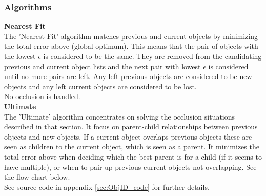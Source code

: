 \subsubsection{Algorithms}
\textbf{Nearest Fit} \\
The 'Nearest Fit' algorithm matches previous and current objects by minimizing the total error above (global optimum). This means that the pair of objects with the lowest $\epsilon$ is considered to be the same. They are removed from the candidating previous and current object lists and the next pair with lowest $\epsilon$ is considered until no more pairs are left. Any left previous objects are considered to be new objects and any left current objects are considered to be lost. \\
No occlusion is handled. \\
\newline
\textbf{Ultimate}\\
The 'Ultimate' algorithm concentrates on solving the occlusion situations described in that section. It focus on parent-child relationships between previous objects and new objects. If a current object overlaps previous objects these are seen as children to the current object, which is seen as a parent. It minimizes the total error above when deciding which the best parent is for a child (if it seems to have multiple), or when to pair up previous-current objects not overlapping. See the flow chart below. \\
\newline
See source code in appendix \ref{sec:ObjID_code} for further details. %

